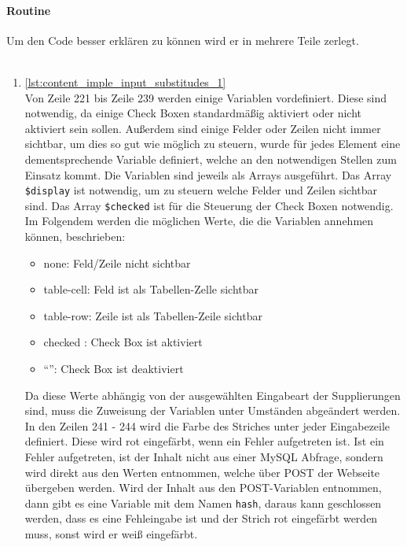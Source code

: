 \paragraph{Routine\\}
Um den Code besser erklären zu können wird er in mehrere Teile zerlegt.\\
\\
\begin{enumerate}
	\item \autoref{lst:content_imple_input_substitudes_1}\\
	Von Zeile 221 bis Zeile 239 werden einige Variablen vordefiniert. Diese sind notwendig, da einige Check Boxen standardmäßig aktiviert oder nicht aktiviert sein sollen. Außerdem sind einige Felder oder Zeilen nicht immer sichtbar, um dies so gut wie möglich zu steuern, wurde für jedes Element eine dementsprechende Variable definiert, welche an den notwendigen Stellen zum Einsatz kommt. Die Variablen sind jeweils als Arrays ausgeführt. Das Array \texttt{\$display} ist notwendig, um zu steuern welche Felder und Zeilen sichtbar sind. Das Array \texttt{\$checked} ist für die Steuerung der Check Boxen notwendig.
	Im Folgendem werden die möglichen Werte, die die Variablen annehmen können, beschrieben:
	\begin{itemize}
		\item none: Feld/Zeile nicht sichtbar
		\item table-cell: Feld ist als Tabellen-Zelle sichtbar
		\item table-row: Zeile ist als Tabellen-Zeile sichtbar
		\item checked : Check Box ist aktiviert
		\item \enquote{}: Check Box ist deaktiviert
	\end{itemize}
	Da diese Werte abhängig von der ausgewählten Eingabeart der Supplierungen sind, muss die Zuweisung der Variablen unter Umständen abgeändert werden.\\
	In den Zeilen 241 - 244 wird die Farbe des Striches unter jeder Eingabezeile definiert. Diese wird rot eingefärbt, wenn ein Fehler aufgetreten ist. Ist ein Fehler aufgetreten, ist der Inhalt nicht aus einer MySQL Abfrage, sondern wird direkt aus den Werten entnommen, welche über POST der Webseite übergeben werden. Wird der Inhalt aus den POST-Variablen entnommen, dann gibt es eine Variable mit dem Namen \texttt{hash}, daraus kann geschlossen werden, dass es eine Fehleingabe ist und der Strich rot eingefärbt werden muss, sonst wird er weiß eingefärbt.\\
	

\end{enumerate}
